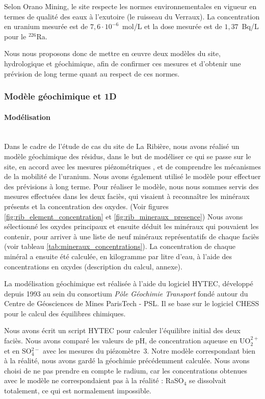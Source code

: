 \documentclass{article}
\begin{document}
Selon Orano Mining, le site respecte les normes environnementales en vigueur en termes de qualité des eaux à l’exutoire (le ruisseau du Verraux). La concentration en uranium mesurée est de $7,6 \cdot 10^{-6}$~mol/L et la dose mesurée est de $1,37$~Bq/L pour le $^{226}$Ra. %

Nous nous proposons donc de mettre en œuvre deux modèles du site, hydrologique et géochimique, afin de confirmer ces mesures et d’obtenir une prévision de long terme quant au respect de ces normes. 

\subsubsection{Modèle géochimique et 1D}

\paragraph{Modélisation \\ \\}
Dans le cadre de l’étude de cas du site de La Ribière, nous avons réalisé un modèle géochimique des résidus, dans le but de modéliser ce qui se passe sur le site, en accord avec les mesures piézométriques \cite{societe_areva_nc_etude_2010}, et de comprendre les mécanismes de la mobilité de l’uranium. Nous avons également utilisé le modèle pour effectuer des prévisions à long terme.
Pour réaliser le modèle, nous nous sommes servis des mesures effectuées dans les deux faciès, qui visaient à reconnaître les minéraux présents et la concentration des oxydes. (Voir figures \ref{fig:rib_element_concentration} et \ref{fig:rib_mineraux_presence}) Nous avons sélectionné les oxydes principaux et ensuite déduit les minéraux qui pouvaient les contenir, pour arriver à une liste de neuf minéraux représentatifs de chaque faciès (voir tableau \ref{tab:mineraux_concentrations}). La concentration de chaque minéral a ensuite été calculée, en kilogramme par litre d’eau, à l’aide des concentrations en oxydes (description du calcul, annexe).

La modélisation géochimique est réalisée à l'aide du logiciel HYTEC, développé depuis 1993 au sein du consortium \emph{Pôle Géochimie Transport} fondé autour du Centre de Géosciences de Mines ParisTech - PSL. Il se base sur le logiciel CHESS \cite{lagneau:hal-00614306} pour le calcul des équilibres chimiques. 
	
Nous avons écrit un script HYTEC pour calculer l’équilibre initial des deux faciès. Nous avons comparé les valeurs de pH, de concentration aqueuse en UO$_2^{2+}$ et en SO$_4^{2-}$ avec les mesures du piézomètre~3. Notre modèle correspondant bien à la réalité, nous avons gardé la géochimie précédemment calculée. Nous avons choisi de ne pas prendre en compte le radium, car les concentrations obtenues avec le modèle ne correspondaient pas à la réalité : RaSO$_4$ se dissolvait totalement, ce qui est normalement impossible.
\end{document}
